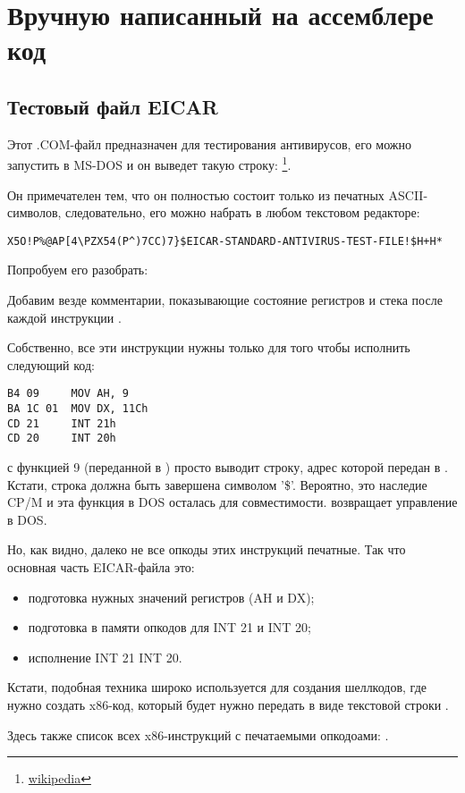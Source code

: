 \section{Вручную написанный на ассемблере код}

\subsection{Тестовый файл EICAR}
\label{subsec:EICAR}

Этот .COM-файл предназначен для тестирования антивирусов, его можно запустить в MS-DOS
и он выведет такую строку: 
\footnote{\href{http://go.yurichev.com/17005}{wikipedia}}.

Он примечателен тем, что он полностью состоит только из печатных ASCII-символов, следовательно, его можно
набрать в любом текстовом редакторе:

\begin{lstlisting}
X5O!P%@AP[4\PZX54(P^)7CC)7}$EICAR-STANDARD-ANTIVIRUS-TEST-FILE!$H+H*
\end{lstlisting}

Попробуем его разобрать:



Добавим везде комментарии, показывающие состояние регистров и стека после каждой инструкции%
.

Собственно, все эти инструкции нужны только для того чтобы исполнить следующий код:

\begin{lstlisting}
B4 09     MOV AH, 9
BA 1C 01  MOV DX, 11Ch
CD 21     INT 21h
CD 20     INT 20h
\end{lstlisting}

 с функцией 9 (переданной в ) просто выводит строку, адрес которой передан в .
Кстати, строка должна быть завершена символом '\$'.
Вероятно, это наследие \gls{CP/M} 
и эта функция в DOS осталась для совместимости.
 возвращает управление в DOS.

Но, как видно, далеко не все опкоды этих инструкций печатные.
Так что основная часть EICAR-файла это:

\begin{itemize}
\item подготовка нужных значений регистров (AH и DX);
\item подготовка в памяти опкодов для INT 21 и INT 20;
\item исполнение INT 21 \AndENRU INT 20.
\end{itemize}

Кстати, подобная техника широко используется для создания шеллкодов, 
где нужно создать x86-код, который будет нужно передать в виде текстовой строки
.

Здесь также список всех x86-инструкций с печатаемыми опкодоами: .
